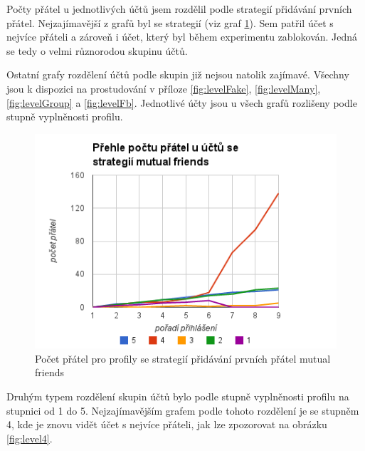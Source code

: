 \documentclass[thesis=M,czech]{FITthesis}[2013/05/10]
\begin{document}
Počty přátel u jednotlivých účtů jsem rozdělil podle strategií přidávání prvních přátel. Nejzajímavější z grafů byl se strategií (viz graf \ref{fig:levelMutual}). Sem patřil účet s nejvíce přáteli a zároveň i účet, který byl během experimentu zablokován. Jedná se tedy o velmi různorodou skupinu účtů. 

Ostatní grafy rozdělení účtů podle skupin již nejsou natolik zajímavé. Všechny jsou k dispozici na prostudování v příloze \ref{fig:levelFake}, \ref{fig:levelMany}, \ref{fig:levelGroup} a \ref{fig:levelFb}. Jednotlivé účty jsou u všech grafů rozlišeny podle stupně vyplněnosti profilu.

\begin{figure}[h]
\begin{center}
\includegraphics[width=5in]{figures/levelMutual.png}
\caption{Počet přátel pro profily se strategií přidávání prvních přátel mutual friends}
\label{fig:levelMutual}
\end{center}
\end{figure}


Druhým typem rozdělení skupin účtů bylo podle stupně vyplněnosti profilu na stupnici od 1 do 5. Nejzajímavějším grafem podle tohoto rozdělení je se stupněm 4, kde je znovu vidět účet s nejvíce přáteli, jak lze zpozorovat na obrázku \ref{fig:level4}. 
\end{document}
